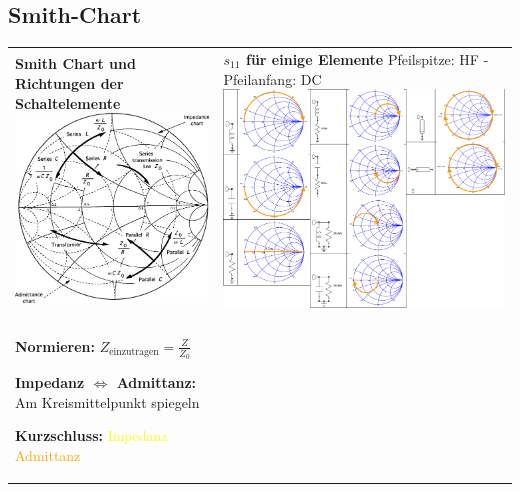 \newpage
\subsection{Smith-Chart }
\begin{tabular}{ll}
\parbox{9cm}{
	\textbf{Smith Chart und Richtungen der Schaltelemente}\\
	\includegraphics[width=8.5cm]{./bilder/rfdesign_smithchart_directions.png}
    }
& \parbox{9cm}{
    \textbf{$s_{11}$ für einige Elemente} \tiny{Pfeilspitze: HF - Pfeilanfang:
    DC}\\
    \includegraphics[width=8.5cm]{./bilder/rfdesign_smithchart_s11.png}
    } \\
\vspace{0.2cm}\\
\parbox{9cm}{
    \begin{liste}
      \item \textbf{Normieren:} $Z_{\text{einzutragen}} = \frac{Z}{Z_0}$
      \item \textbf{Impedanz $\Leftrightarrow$ Admittanz:} Am Kreismittelpunkt spiegeln
      \item \textbf{Kurzschluss:}   \textcolor{yellow}{Impedanz} \textcolor{orange}{Admittanz}

\end{liste}}
\end{tabular}
